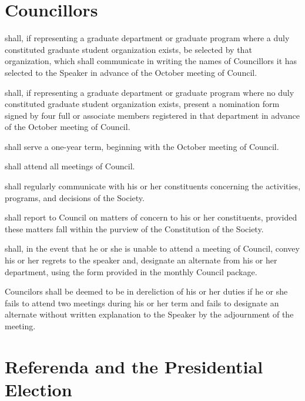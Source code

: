 \newpage


\section{Councillors}
\begin{longenum}[ label*=\thesection.\arabic*., align=left]
	\item shall, if representing a graduate department or graduate program where a duly constituted graduate student organization exists, be selected by that organization, which shall communicate in writing the names of Councillors it has selected to the Speaker in advance of the October meeting of Council. 
    \item shall, if representing a graduate department or graduate program where no duly constituted graduate student organization  exists, present a nomination form signed by four full or associate members registered in that department in advance of the October meeting of Council. 
    \item shall serve a one-year term, beginning with the October meeting of Council. 
    \item shall attend all meetings of Council.
    \item shall regularly communicate with his or her constituents concerning the activities, programs, and decisions of the Society. 
    \item shall report to Council on matters of concern to his or her constituents, provided these matters fall within the purview of the Constitution of the Society. 
    \item shall, in the event that he or she is unable to attend a meeting of Council, convey his or her regrets to the speaker and, designate an alternate from his or her department, using the form provided in the monthly Council package.
    \item Councilors shall be deemed to be in dereliction of his or her duties if he or she fails to attend two meetings during his or her term and fails to designate an alternate without written explanation to the Speaker by the adjournment  of the meeting. 
\end{longenum}
\newpage
\section{Referenda and the Presidential Election}
 

